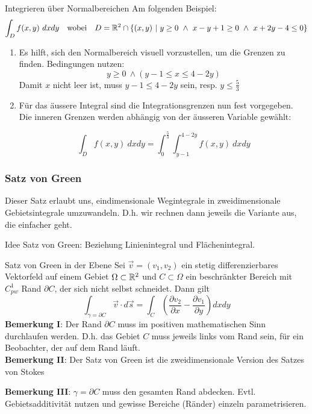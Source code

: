 \begin{Rezept}{Integrieren über Normalbereichen}{}
Am folgenden Beispiel:
\[ \int_D f(x, y) ~ dx dy ~~ \text{ wobei } ~~ D = \mathbb{R}^2 \cap \{(x, y) ~ | ~ y \geq 0 ~ \wedge ~ x-y+1\geq 0 ~ \wedge ~ x+2y-4 \leq 0\}\]
\begin{enumerate}
\item {
Es hilft, sich den Normalbereich visuell vorzustellen, um die Grenzen
zu finden. Bedingungen nutzen:
\[ y \geq 0 ~ \wedge (y-1 \leq x \leq 4-2y) \]
Damit $x$ nicht leer ist, muss $y-1 \leq 4-2y$ sein, resp. $y \leq \frac{5}{3}$ 
}
\item {
Für das äussere Integral sind die Integrationsgrenzen nun fest vorgegeben. Die inneren Grenzen
werden abhängig von der äusseren Variable gewählt:

\[ \int_D f(x,y) ~ dx dy = \int_0^{\frac{5}{3}} \int_{y-1}^{4-2y} f(x,y) ~ dx dy \]

}
\end{enumerate}
\end{Rezept}

\subsubsection{Satz von Green}

Dieser Satz erlaubt uns, eindimensionale Wegintegrale in zweidimensionale Gebietsintegrale umzuwandeln. D.h. wir rechnen dann jeweils die Variante aus, die einfacher geht.

Idee Satz von Green: Beziehung Linienintegral und Flächenintegral.


\begin{Satz}{Satz von Green in der Ebene}{}
	Sei $\vec{v} = (v_1, v_2)$ ein stetig differenzierbares Vektorfeld auf einem Gebiet $\Omega \subset \mathbb{R}^2$ und $C \subset \Omega$ ein beschränkter Bereich mit $C^1_{pw}$ Rand $\partial C$, der sich nicht selbst schneidet. Dann gilt
	\[
		\int_{\gamma=\partial C} \vec{v} \cdot d\vec{s} = 
		\int_C \left(\frac{\partial v_2}{\partial x} - \frac{\partial v_1}{\partial y}\right) dxdy
	\]
	\textbf{Bemerkung I}: Der Rand $\partial C$ muss im positiven mathematischen Sinn durchlaufen werden. D.h. das Gebiet $C$ muss jeweils links vom Rand sein, für ein Beobachter, der auf dem Rand läuft.\\
	
	\textbf{Bemerkung II}: Der Satz von Green ist die zweidimensionale Version des Satzes von Stokes
	
	\textbf{Bemerkung III}: $\gamma=\partial C$ muss den gesamten Rand abdecken. Evtl. Gebietsadditivität nutzen und gewisse Bereiche (Ränder) einzeln parametrisieren.
\end{Satz}

